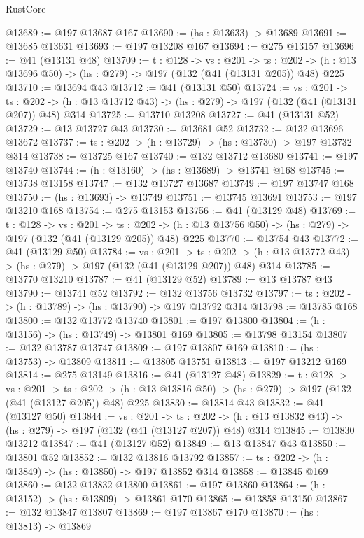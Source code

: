 \begin{lexlean}{RustCore}
\begin{coremodule}
@13689 := @197 @13687 @167
@13690 := (hs : @13633) -> @13689
@13691 := @13685 @13631
@13693 := @197 @13208 @167
@13694 := @275 @13157
@13696 := @41 (@13131 @48)
@13709 := {t : @128} ->
  {vs : @201} ->
  {ts : @202} -> (h : @13 @13696 @50) -> (hs : @279) -> @197 (@132 (@41 (@13131 @205)) @48) @225
@13710 := @13694 @43
@13712 := @41 (@13131 @50)
@13724 := {vs : @201} ->
  {ts : @202} -> (h : @13 @13712 @43) -> (hs : @279) -> @197 (@132 (@41 (@13131 @207)) @48) @314
@13725 := @13710 @13208
@13727 := @41 (@13131 @52)
@13729 := @13 @13727 @43
@13730 := @13681 @52
@13732 := @132 @13696 @13672
@13737 := {ts : @202} -> (h : @13729) -> (hs : @13730) -> @197 @13732 @314
@13738 := @13725 @167
@13740 := @132 @13712 @13680
@13741 := @197 @13740
@13744 := (h : @13160) -> (hs : @13689) -> @13741 @168
@13745 := @13738 @13158
@13747 := @132 @13727 @13687
@13749 := @197 @13747 @168
@13750 := (hs : @13693) -> @13749
@13751 := @13745 @13691
@13753 := @197 @13210 @168
@13754 := @275 @13153
@13756 := @41 (@13129 @48)
@13769 := {t : @128} ->
  {vs : @201} ->
  {ts : @202} -> (h : @13 @13756 @50) -> (hs : @279) -> @197 (@132 (@41 (@13129 @205)) @48) @225
@13770 := @13754 @43
@13772 := @41 (@13129 @50)
@13784 := {vs : @201} ->
  {ts : @202} -> (h : @13 @13772 @43) -> (hs : @279) -> @197 (@132 (@41 (@13129 @207)) @48) @314
@13785 := @13770 @13210
@13787 := @41 (@13129 @52)
@13789 := @13 @13787 @43
@13790 := @13741 @52
@13792 := @132 @13756 @13732
@13797 := {ts : @202} -> (h : @13789) -> (hs : @13790) -> @197 @13792 @314
@13798 := @13785 @168
@13800 := @132 @13772 @13740
@13801 := @197 @13800
@13804 := (h : @13156) -> (hs : @13749) -> @13801 @169
@13805 := @13798 @13154
@13807 := @132 @13787 @13747
@13809 := @197 @13807 @169
@13810 := (hs : @13753) -> @13809
@13811 := @13805 @13751
@13813 := @197 @13212 @169
@13814 := @275 @13149
@13816 := @41 (@13127 @48)
@13829 := {t : @128} ->
  {vs : @201} ->
  {ts : @202} -> (h : @13 @13816 @50) -> (hs : @279) -> @197 (@132 (@41 (@13127 @205)) @48) @225
@13830 := @13814 @43
@13832 := @41 (@13127 @50)
@13844 := {vs : @201} ->
  {ts : @202} -> (h : @13 @13832 @43) -> (hs : @279) -> @197 (@132 (@41 (@13127 @207)) @48) @314
@13845 := @13830 @13212
@13847 := @41 (@13127 @52)
@13849 := @13 @13847 @43
@13850 := @13801 @52
@13852 := @132 @13816 @13792
@13857 := {ts : @202} -> (h : @13849) -> (hs : @13850) -> @197 @13852 @314
@13858 := @13845 @169
@13860 := @132 @13832 @13800
@13861 := @197 @13860
@13864 := (h : @13152) -> (hs : @13809) -> @13861 @170
@13865 := @13858 @13150
@13867 := @132 @13847 @13807
@13869 := @197 @13867 @170
@13870 := (hs : @13813) -> @13869

\end{coremodule}
\end{lexlean}
